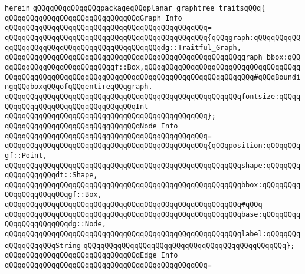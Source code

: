 \verb|herein|\newline
\newline
\verb|qQQqqQQqqQQqqQQqpackageqQQqplanar_graphtree_traitsqQQq{|\newline
\newline
\verb|qQQqqQQqqQQqqQQqqQQqqQQqqQQqqQQqGraph_Info|\newline
\verb|qQQqqQQqqQQqqQQqqQQqqQQqqQQqqQQqqQQqqQQqqQQqqQQq=|\newline
\verb|qQQqqQQqqQQqqQQqqQQqqQQqqQQqqQQqqQQqqQQqqQQqqQQq{qQQqgraph:qQQqqQQqqQQqqQQqqQQqqQQqqQQqqQQqqQQqqQQqqQQqqQQqdg::Traitful_Graph,|\newline
\verb|qQQqqQQqqQQqqQQqqQQqqQQqqQQqqQQqqQQqqQQqqQQqqQQqqQQqqQQqgraph_bbox:qQQqqQQqqQQqqQQqqQQqqQQqqQQqgf::Box,qQQqqQQqqQQqqQQqqQQqqQQqqQQqqQQqqQQqqQQqqQQqqQQqqQQqqQQqqQQqqQQqqQQqqQQqqQQqqQQqqQQqqQQqqQQqqQQq#qQQqBoundingqQQqboxqQQqofqQQqentireqQQqgraph.|\newline
\verb|qQQqqQQqqQQqqQQqqQQqqQQqqQQqqQQqqQQqqQQqqQQqqQQqqQQqqQQqfontsize:qQQqqQQqqQQqqQQqqQQqqQQqqQQqqQQqqQQqInt|\newline
\verb|qQQqqQQqqQQqqQQqqQQqqQQqqQQqqQQqqQQqqQQqqQQqqQQq};|\newline
\newline
\verb|qQQqqQQqqQQqqQQqqQQqqQQqqQQqqQQqNode_Info|\newline
\verb|qQQqqQQqqQQqqQQqqQQqqQQqqQQqqQQqqQQqqQQqqQQqqQQq=|\newline
\verb|qQQqqQQqqQQqqQQqqQQqqQQqqQQqqQQqqQQqqQQqqQQqqQQq{qQQqposition:qQQqqQQqgf::Point,|\newline
\verb|qQQqqQQqqQQqqQQqqQQqqQQqqQQqqQQqqQQqqQQqqQQqqQQqqQQqqQQqshape:qQQqqQQqqQQqqQQqqQQqdt::Shape,|\newline
\verb|qQQqqQQqqQQqqQQqqQQqqQQqqQQqqQQqqQQqqQQqqQQqqQQqqQQqqQQqbbox:qQQqqQQqqQQqqQQqqQQqqQQqgf::Box,|\newline
\verb|qQQqqQQqqQQqqQQqqQQqqQQqqQQqqQQqqQQqqQQqqQQqqQQqqQQqqQQq#qQQq|\newline
\verb|qQQqqQQqqQQqqQQqqQQqqQQqqQQqqQQqqQQqqQQqqQQqqQQqqQQqqQQqbase:qQQqqQQqqQQqqQQqqQQqqQQqdg::Node,|\newline
\verb|qQQqqQQqqQQqqQQqqQQqqQQqqQQqqQQqqQQqqQQqqQQqqQQqqQQqqQQqlabel:qQQqqQQqqQQqqQQqqQQqString|\newline
\verb|qQQqqQQqqQQqqQQqqQQqqQQqqQQqqQQqqQQqqQQqqQQqqQQq};|\newline
\newline
\verb|qQQqqQQqqQQqqQQqqQQqqQQqqQQqqQQqEdge_Info|\newline
\verb|qQQqqQQqqQQqqQQqqQQqqQQqqQQqqQQqqQQqqQQqqQQqqQQq=|\newline

